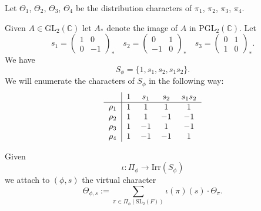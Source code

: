 \documentclass[11pt]{amsart}
\numberwithin{equation}{section}
\def\Irr{\mathrm{Irr}}
\def\PGL{\mathrm{PGL}}
\def\GL{\mathrm{GL}}
\def\C{\mathbb{C}}
\def\SL{\mathrm{SL}}
\newcommand{\<}{\left\langle}
\renewcommand{\>}{\right\rangle}
\begin{document}
Let  $\Theta_1$,  $\Theta_2$, $\Theta_3$, $\Theta_4$ be the distribution characters of $\pi_1$, $\pi_2$, $\pi_3$, $\pi_4$. 

Given $A \in \GL_2(\C)$ let $A_*$ denote the image of $A$ in $\PGL_2(\C)$.   Let
       \begin{equation} \label{eqn:si}
       s_1 = \left(
       \begin{array}{cc}
       1 & 0\\
       0 & -1
       \end{array}
       \right)_*
             \quad s_2 = \left(\begin{array}{cc}
       0 & 1\\-1 & 0
       \end{array}
       \right)_*
       \quad 
       s_3 = \left(
       \begin{array}{cc}
       0 & 1\\
       1 & 0
       \end{array}
       \right)_*.
       \end{equation}  
 We have
       \[
       S_\phi = \{1, s_1, s_2, s_1s_2 \}.
       \]
We will enumerate the characters of $S_\phi$ in the following way:
       \[
       \begin{tabular}{c|cccc}
       & $1$ & $s_1$ & $s_2$ & $s_1s_2$\\
       \hline
       $\rho_1$ & $1$ & $1$ & $1$ & $1$\\
       $\rho_2$ & $1$ & $1$ & $-1$ & $-1$\\
       $\rho_3$ & $1$ & $-1$ & $1$ & $-1$\\
       $\rho_4$ & $1$ & $-1$ & $-1$ & $1$
       \end{tabular}
       \]

Given 
\begin{equation} 
\iota \colon\Pi_\phi \to \Irr(S_\phi)
\end{equation}
 we attach to $(\phi,s)$ the  virtual character    
\begin{equation} \label{eqn:virtual}                                                       
\Theta_{\phi, s} := \sum_{\pi\in\Pi_\phi(\SL_2(F)) } \iota(\pi)(s) \cdot \Theta_{\pi}.
\end{equation}
   
\end{document}
